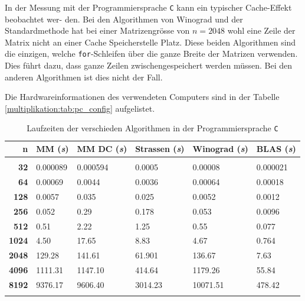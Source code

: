 In der Messung mit der Programmiersprache \texttt{C} kann ein typischer Cache-Effekt beobachtet wer-
den.
Bei den Algorithmen von Winograd und der Standardmethode hat bei einer Matrizengrösse von $n = 2048$ wohl eine Zeile der Matrix nicht an einer Cache Speicherstelle Platz.
Diese beiden Algorithmen sind die einzigen, welche \texttt{for}-Schleifen über die ganze Breite der Matrizen verwenden.
Dies führt dazu, dass ganze Zeilen zwischengespeichert werden müssen.
Bei den anderen Algorithmen ist dies nicht der Fall.

Die Hardwareinformationen des verwendeten Computers sind in der Tabelle \ref{multiplikation:tab:pc_config} aufgelistet.


\begin{table}
			 \begin{center}
					 \begin{tabular}{r l l l l l}
							 \hline
							 \hline
							 \textbf{n} & \textbf{MM (\textit{s})} &  \textbf{MM DC (\textit{s})} & \textbf{Strassen (\textit{s})}  & \textbf{Winograd (\textit{s})} & \textbf{BLAS (\textit{s})} \\
							 \hline
							 \multicolumn{6}{c}{} \\
							 \textbf{32}   & \phantom{000}0.000089 & \phantom{000}0.000594 & \phantom{000}0.0005  & \phantom{0000}0.00008 & \phantom{00}0.000021  \\
							 \textbf{64}   & \phantom{000}0.00069  & \phantom{000}0.0044   & \phantom{000}0.0036  & \phantom{0000}0.00064 & \phantom{00}0.00018   \\
							 \textbf{128}  & \phantom{000}0.0057   & \phantom{000}0.035    & \phantom{000}0.025   & \phantom{0000}0.0052  & \phantom{00}0.0012    \\
							 \textbf{256}  & \phantom{000}0.052    & \phantom{000}0.29     & \phantom{000}0.178   & \phantom{0000}0.053   & \phantom{00}0.0096     \\
							 \textbf{512}  & \phantom{000}0.51     & \phantom{000}2.22     & \phantom{000}1.25    & \phantom{0000}0.55    & \phantom{00}0.077     \\
							 \textbf{1024} & \phantom{000}4.50     & \phantom{00}17.65     & \phantom{000}8.83    & \phantom{0000}4.67    & \phantom{00}0.764     \\
							 \textbf{2048} & \phantom{0}129.28     & \phantom{0}141.61     & \phantom{00}61.901   & \phantom{00}136.67    & \phantom{00}7.63      \\
							 \textbf{4096} & 1111.31               & 1147.10               & \phantom{0}414.64    & \phantom{0}1179.26    & \phantom{0}55.84     \\
							 \textbf{8192} & 9376.17               & 9606.40               & 3014.23              & 10071.51              & 478.42     \\
							 \multicolumn{6}{c}{} \\
							 \hline
							 \hline
					 \end{tabular}
			 \end{center}
			 \caption{Laufzeiten der verschieden Algorithmen in der Programmiersprache \texttt{C}}
			 \label{multiplikation:tab:messung_C}
	 \end{table}



